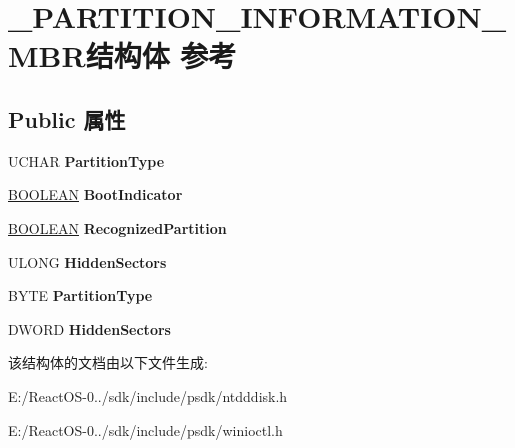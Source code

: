 \hypertarget{struct___p_a_r_t_i_t_i_o_n___i_n_f_o_r_m_a_t_i_o_n___m_b_r}{}\section{\+\_\+\+P\+A\+R\+T\+I\+T\+I\+O\+N\+\_\+\+I\+N\+F\+O\+R\+M\+A\+T\+I\+O\+N\+\_\+\+M\+B\+R结构体 参考}
\label{struct___p_a_r_t_i_t_i_o_n___i_n_f_o_r_m_a_t_i_o_n___m_b_r}
\subsection*{Public 属性}
\begin{DoxyCompactItemize}
\item 
\mbox{\label{struct___p_a_r_t_i_t_i_o_n___i_n_f_o_r_m_a_t_i_o_n___m_b_r_ac6054aea2c96cfdec41a01cd6908de8e}} 
U\+C\+H\+AR {\bfseries Partition\+Type}
\item 
\mbox{\label{struct___p_a_r_t_i_t_i_o_n___i_n_f_o_r_m_a_t_i_o_n___m_b_r_abd8a65e0ffd144f9ee244513560e4e9e}} 
\hyperlink{_processor_bind_8h_a112e3146cb38b6ee95e64d85842e380a}{B\+O\+O\+L\+E\+AN} {\bfseries Boot\+Indicator}
\item 
\mbox{\label{struct___p_a_r_t_i_t_i_o_n___i_n_f_o_r_m_a_t_i_o_n___m_b_r_a9073a9d939b0e6baf8f9a81b1977159c}} 
\hyperlink{_processor_bind_8h_a112e3146cb38b6ee95e64d85842e380a}{B\+O\+O\+L\+E\+AN} {\bfseries Recognized\+Partition}
\item 
\mbox{\label{struct___p_a_r_t_i_t_i_o_n___i_n_f_o_r_m_a_t_i_o_n___m_b_r_ac7d42ce00aab656d03382f57413954da}} 
U\+L\+O\+NG {\bfseries Hidden\+Sectors}
\item 
\mbox{\label{struct___p_a_r_t_i_t_i_o_n___i_n_f_o_r_m_a_t_i_o_n___m_b_r_a7110f07f879c7ffa3820ffd7eb7aab4b}} 
B\+Y\+TE {\bfseries Partition\+Type}
\item 
\mbox{\label{struct___p_a_r_t_i_t_i_o_n___i_n_f_o_r_m_a_t_i_o_n___m_b_r_a21bd762171f2ed5d16fa2c08e37c70d6}} 
D\+W\+O\+RD {\bfseries Hidden\+Sectors}
\end{DoxyCompactItemize}


该结构体的文档由以下文件生成\+:\begin{DoxyCompactItemize}
\item 
E\+:/\+React\+O\+S-\/0../sdk/include/psdk/ntdddisk.\+h\item 
E\+:/\+React\+O\+S-\/0../sdk/include/psdk/winioctl.\+h\end{DoxyCompactItemize}
